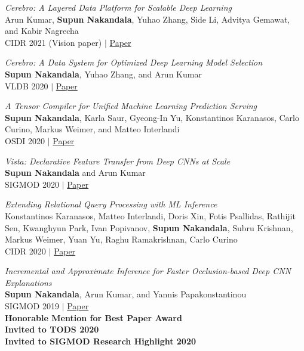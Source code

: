 \documentclass[margin]{res}
\begin{document}
\begin{resume}
\par
\textit{Cerebro: A Layered Data Platform for Scalable Deep Learning} \\
Arun Kumar, \textbf{Supun Nakandala}, Yuhao Zhang,  Side Li, Advitya Gemawat, and Kabir
Nagrecha\\
CIDR 2021 (Vision paper) $|$ \href{https://adalabucsd.github.io/papers/2021_Cerebro_CIDR.pdf}{Paper}

\par
\textit{Cerebro: A Data System for Optimized Deep Learning Model Selection} \\
\textbf{Supun Nakandala}, Yuhao Zhang, and Arun Kumar\\
VLDB 2020 $|$ \href{https://adalabucsd.github.io/papers/2020_Cerebro_VLDB.pdf}{Paper}

\par
\textit{A Tensor Compiler for Unified Machine Learning Prediction Serving} \\
\textbf{Supun Nakandala}, Karla Saur, Gyeong-In Yu, Konstantinos Karanasos, Carlo Curino, Markus Weimer, and Matteo Interlandi\\
OSDI 2020 $|$ \href{https://www.usenix.org/conference/osdi20/presentation/nakandala}{Paper}

\par
\textit{Vista: Declarative Feature Transfer from Deep CNNs at Scale} \\
\textbf{Supun Nakandala} and Arun Kumar\\
SIGMOD 2020 $|$ \href{https://adalabucsd.github.io/papers/2020_Vista_SIGMOD.pdf}{Paper}

\par
\textit{Extending Relational Query Processing with ML Inference} \\
Konstantinos Karanasos, Matteo Interlandi, Doris Xin, Fotis Psallidas, Rathijit Sen, Kwanghyun Park, Ivan Popivanov, \textbf{Supun Nakandala}, Subru Krishnan, Markus Weimer, Yuan Yu, Raghu Ramakrishnan, Carlo Curino\\
CIDR 2020 $|$ \href{http://cidrdb.org/cidr2020/papers/p24-karanasos-cidr20.pdf}{Paper}

\par
\textit{Incremental and Approximate Inference for Faster Occlusion-based Deep CNN Explanations} \\
\textbf{Supun Nakandala}, Arun Kumar, and Yannis Papakonstantinou \\
SIGMOD 2019 $|$ \href{https://adalabucsd.github.io/papers/2019_Krypton_SIGMOD.pdf}{Paper}\\
\textbf{Honorable Mention for Best Paper Award\\ Invited to TODS 2020\\ Invited to SIGMOD Research Highlight 2020}


\end{resume}
\end{document}
